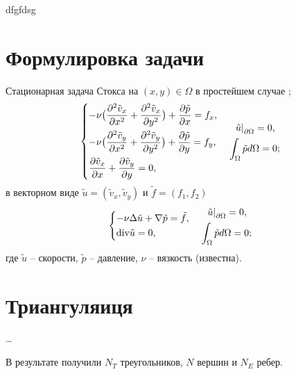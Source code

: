 \documentclass[a4paper,14pt]{extarticle}
\begin{document}
	dfgfdsg
	\section{Формулировка задачи}
	Стационарная задача Стокса на $(x,y)\in\Omega$ в простейшем случае
;	\begin{equation}
		\begin{dcases}
			-\nu \big(\frac{\partial^2 \tilde v_x}{\partial x^2} + \frac{\partial^2 \tilde v_x}{\partial y^2}\big) + \frac{\partial \tilde p}{\partial x} = f_x, \\
			-\nu \big(\frac{\partial^2 \tilde v_y}{\partial x^2} + \frac{\partial^2 \tilde v_y}{\partial y^2}\big) + \frac{\partial \tilde p}{\partial y} = f_y, \\
			\frac{\partial \tilde v_x}{\partial x}
			+ \frac{\partial \tilde v_y}{\partial y} = 0,
		\end{dcases}
		\quad
		\begin{gathered}
			\left.\tilde u\right|_{\partial\Omega}=0,\\
			\int_{\Omega}\tilde p d \Omega = 0;
		\end{gathered}
		\label{eq:1}
	\end{equation}
	в векторном виде  $\tilde u = (\tilde v_x, \tilde v_y)$ и $\tilde f = (f_1,f_2)$
	\begin{equation}
		\begin{dcases}
			-\nu \Delta \tilde u + \nabla \tilde p  = \tilde f, \\
			\mathrm{div} \tilde u = 0,
		\end{dcases}
		\quad
		\begin{gathered}
			\left.\tilde u\right|_{\partial\Omega}=0,\\
			\int_{\Omega}\tilde p d \Omega = 0;
		\end{gathered}
		\label{eq:2}
	\end{equation}
	где $\tilde u$ -- скорости, $\tilde p$ -- давление, $\nu$ -- вязкость (известна).
	
	\section{Триангуляиця}
	\dots
	
	В результате получили $N_T$ треугольников, $N$ вершин и $N_E$ ребер.
	
	
	
\end{document}
